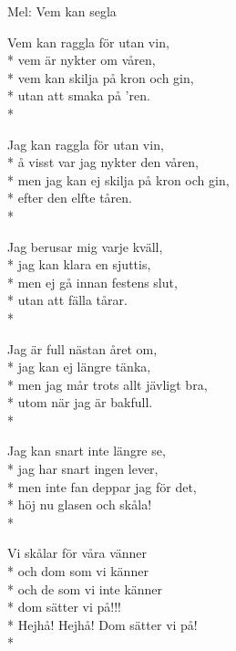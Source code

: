 \begin{SongText}
    \begin{SongInfo}
        Mel: Vem kan segla
    \end{SongInfo}
    \begin{SongVerse}
        Vem kan raggla för utan vin,\\*%
        vem är nykter om våren,\\*%
        vem kan skilja på kron och gin,\\*%
        utan att smaka på 'ren.\\*%
    \end{SongVerse}
    \begin{SongVerse}
        Jag kan raggla för utan vin,\\*%
        å visst var jag nykter den våren,\\*%
        men jag kan ej skilja på kron och gin,\\*%
        efter den elfte tåren.\\*%
    \end{SongVerse}
    \begin{SongVerse}
        Jag berusar mig varje kväll,\\*%
        jag kan klara en sjuttis,\\*%
        men ej gå innan festens slut,\\*%
        utan att fälla tårar.\\*%
    \end{SongVerse}
    \begin{SongVerse}
        Jag är full nästan året om,\\*%
        jag kan ej längre tänka,\\*%
        men jag mår trots allt jävligt bra,\\*%
        utom när jag är bakfull.\\*%
    \end{SongVerse}
    \begin{SongVerse}
        Jag kan snart inte längre se,\\*%
        jag har snart ingen lever,\\*%
        men inte fan deppar jag för det,\\*%
        höj nu glasen och skåla!\\*%
    \end{SongVerse}
\end{SongText}
\begin{SongText}
    \begin{SongVerse}
        Vi skålar för våra vänner\\*%
        och dom som vi känner\\*%
        och de som vi inte känner\\*%
        dom sätter vi på!!!\\*%
        Hejhå! Hejhå! Dom sätter vi på!\\*%
    \end{SongVerse}
\end{SongText}
